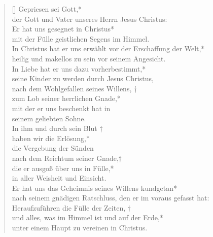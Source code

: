 \begin{verse}[\versewidth]
Gepriesen sei Gott,*\\
der Gott und Vater unseres Herrn Jesus Christus:\\
\vin Er hat uns gesegnet in Christus*\\
\vin mit der Fülle geistlichen Segens im Himmel.\\
In Christus hat er uns erwählt vor der Erschaffung der Welt,*\\
heilig und makellos zu sein vor seinem Angesicht.\\
\vin In Liebe hat er uns dazu vorherbestimmt,*\\
\vin seine Kinder zu werden durch Jesus Christus,\\
nach dem Wohlgefallen seines Willens, †\\
zum Lob seiner herrlichen Gnade,*\\
mit der er uns beschenkt hat in\\
seinem geliebten Sohne.\\
\vin In ihm und durch sein Blut †\\
\vin haben wir die Erlösung,*\\
\vin die Vergebung der Sünden\\
nach dem Reichtum seiner Gnade,†\\
die er ausgoß über uns in Fülle,*\\
in aller Weisheit und Einsicht.\\
\vin Er hat uns das Geheimnis seines Willens kundgetan*\\
\vin nach seinem gnädigen Ratschluss, den er im voraus gefasst hat:\\
Heraufzuführen die Fülle der Zeiten, †\\
und alles, was im Himmel ist und auf der Erde,*\\
unter einem Haupt zu vereinen in Christus.\\

\end{verse}

\vspace{0.6cm}



\resp


\vspace{0.6cm}


